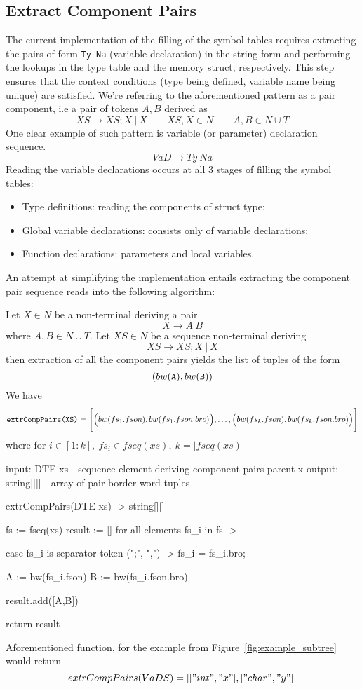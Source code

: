 \subsection{Extract Component Pairs}\label{subsec:extract-component-pairs}
The current implementation of the filling of the symbol tables requires extracting the pairs
of form \verb+Ty Na+ (variable declaration) in the string form and performing the lookups in the
type table and the memory struct, respectively.
This step ensures that the context conditions (type being defined, variable name being unique) are satisfied.
We're referring to the aforementioned pattern as a pair component, i.e a pair of tokens $A, B$ derived as
\[ XS \to XS; X\ |\ X\qquad XS,X \in N\qquad A,B\in N\cup T\]
One clear example of such pattern is variable (or parameter) declaration sequence.
\[ VaD \to Ty\ Na\]
Reading the variable declarations occurs at all 3 stages of filling the symbol tables:
\begin{itemize}
    \item Type definitions: reading the components of struct type;
    \item Global variable declarations: consists only of variable declarations;
    \item Function declarations: parameters and local variables.
\end{itemize}
An attempt at simplifying the implementation entails extracting the component pair sequence reads
into the following algorithm:

\begin{definition}[extractCompPairs]
    Let $X \in N$ be a non-terminal deriving a pair
    \[X \to A\ B\]
    where $A,B \in N\cup T$.
    Let $XS \in N$ be a sequence non-terminal deriving
    \[ XS \to XS;X\ |\ X\]
    then extraction of all the component pairs yields the list of tuples of the form
    \[(bw(\verb+A+), bw(\verb+B+)) \]
    We have
    \[ \verb+extrCompPairs(XS)+ = \Bigg[ \Big( bw(fs_1.fson),bw(fs_1.fson.bro) \Big),\dots,\Big( bw(fs_k.fson),bw(fs_k.fson.bro) \Big) \Bigg]\]
    where for $i\in[1:k],\ fs_i \in fseq(xs),\ k=|fseq(xs)|$
\end{definition}
\begin{codeblock}
    input: DTE xs - sequence element deriving component pairs parent x
    output: string[][] - array of pair border word tuples

    extrCompPairs(DTE xs) -> string[][] {
        fs := fseq(xs)
        result := []
        for all elements fs_i in fs -> {
            case fs_i is separator token (";", ",") -> fs_i = fs_i.bro;

            A := bw(fs_i.fson)
            B := bw(fs_i.fson.bro)

            result.add([A,B])
        }
        return result
    }
\end{codeblock}
Aforementioned function, for the example from Figure~\ref{fig:example_subtree} would return
\[extrCompPairs(VaDS) = [["int", "x"], ["char", "y"]]\]


